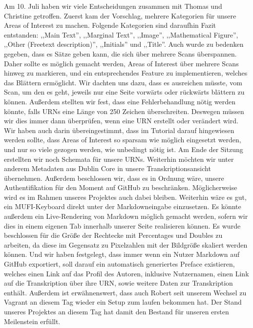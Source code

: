 \documentclass{article}
\begin{document}


Am 10. Juli haben wir viele Entscheidungen zusammen mit Thomas und Christine getroffen.
Zuerst kam der Vorschlag,
mehrere Kategorien für unsere Areas of Interest zu machen.
Folgende Kategorien sind daraufhin Fazit entstanden:
,,Main Text'', ,,Marginal Text'', ,,Image'', ,,Mathematical Figure'',
,,Other (Freetext description)'', ,,Initials'' und ,,Title''.
Auch wurde zu bedenken gegeben,
dass es Sätze geben kann,
die sich über mehrere Scans überspannen.
Daher sollte es möglich gemacht werden,
Areas of Interest über mehrere Scans hinweg zu markieren,
und ein entsprechendes Feature zu implementieren,
welches das Blättern ermöglicht.
Wir dachten uns dazu,
dass es ausreichen müsste, vom Scan, um den es geht,
jeweils nur eine Seite vorwärts oder rückwärts blättern zu können.
Außerdem stellten wir fest,
dass eine Fehlerbehandlung nötig werden könnte,
falls URNs eine Länge von 250 Zeichen überschreiten.
Deswegen müssen wir dies immer dann überprüfen,
wenn eine URN erstellt oder verändert wird.
Wir haben auch darin übereingestimmt,
dass im Tutorial darauf hingewiesen werden sollte,
dass Areas of Interest so sparsam wie möglich eingesetzt werden,
und nur so viele gezogen werden,
wie unbedingt nötig ist.
Am Ende der Sitzung erstellten wir noch Schemata für unsere URNs.
Weiterhin möchten wir unter anderem Metadaten aus
Dublin Core in unsere Transkriptionsansicht übernehmen.
Außerdem beschlossen wir,
dass es in Ordnung wäre,
unsere Authentifikation für den Moment auf GitHub zu beschränken.
Möglicherweise wird es im Rahmen unseres Projektes auch dabei bleiben.
Weiterhin wäre es gut,
ein MUFI-Keyboard direkt unter der Markdowneingabe einzusetzen.
Es könnte außerdem ein Live-Rendering von Markdown möglich gemacht werden,
sofern wir dies in einem eigenen Tab innerhalb unserer Seite realisieren können.
Es wurde beschlossen für die Größe der Rechtecke mit Percentages und Doubles zu arbeiten,
da diese im Gegensatz zu Pixelzahlen mit der Bildgröße skaliert werden können.
Und wir haben festgelegt,
dass immer wenn ein Nutzer Markdown auf GitHub exportiert,
soll darauf ein automatisch generiertes Preface existieren,
welches einen Link auf das Profil des Autoren,
inklusive Nutzernamen,
einen Link auf die Transkription über ihre URN,
sowie weitere Daten zur Transkription enthält.
Außerdem ist erwähnenswert,
dass auch Robert seit unserem Wechsel zu Vagrant an
diesem Tag wieder ein Setup zum laufen bekommen hat.
Der Stand unseres Projektes an diesem Tag hat damit
den Bestand für unseren ersten Meilenstein erfüllt. \\
\end{document}
